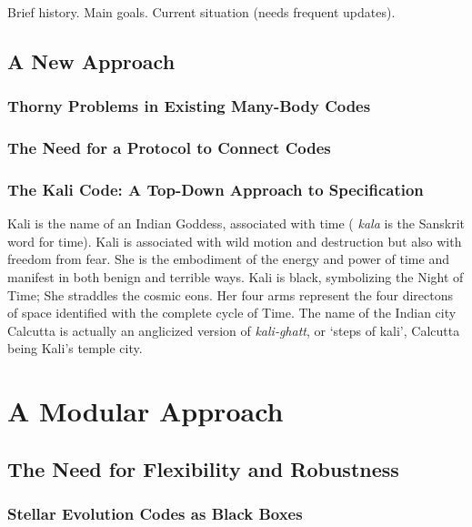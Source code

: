 \documentclass{article}[12pt]
\def\filler{xxxx xxxx xxxx xxxx xxxx xxxx xxxx xxxx xxxx xxxx xxxx xxxx
xxxx xxxx xxxx xxxx xxxx xxxx xxxx xxxx xxxx xxxx xxxx xxxx
xxxx xxxx xxxx xxxx xxxx xxxx xxxx xxxx xxxx xxxx xxxx xxxx
xxxx xxxx xxxx xxxx xxxx xxxx xxxx xxxx xxxx xxxx xxxx xxxx
xxxx xxxx xxxx xxxx xxxx xxxx xxxx xxxx xxxx xxxx xxxx xxxx
xxxx xxxx xxxx xxxx xxxx xxxx xxxx xxxx xxxx xxxx xxxx xxxx
xxxx xxxx xxxx xxxx xxxx xxxx xxxx xxxx xxxx xxxx xxxx xxxx
xxxx xxxx xxxx xxxx xxxx xxxx xxxx xxxx xxxx xxxx xxxx xxxx}
\def\filler{}
\begin{document}
Brief history.  Main goals.  Current situation (needs frequent updates).

\subsection{A New Approach}

\filler

\subsubsection{Thorny Problems in Existing Many-Body Codes}

\filler

\subsubsection{The Need for a Protocol to Connect Codes}

\filler

\subsubsection{The Kali Code: A Top-Down Approach to Specification}

Kali is the name of an Indian Goddess, associated with time ({\it
kala} is the Sanskrit word for time).  Kali is associated with wild
motion and destruction but also with freedom from fear.  She is the
embodiment of the energy and power of time and manifest in both benign
and terrible ways.  Kali is black, symbolizing the Night of Time; She
straddles the cosmic eons.  Her four arms represent the four directons
of space identified with the complete cycle of Time.  The name of the
Indian city Calcutta is actually an anglicized version of {\it
kali-ghatt}, or `steps of kali', Calcutta being Kali's temple city.

\clearpage
\newpage

\section{A Modular Approach}

\filler

\subsection{The Need for Flexibility and Robustness}

\filler

\subsubsection{Stellar Evolution Codes as Black Boxes}
\end{document}
